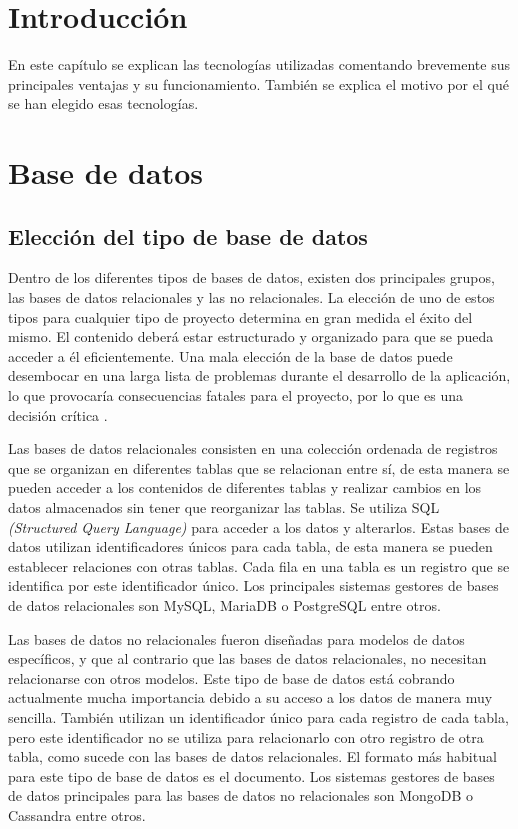 \section{Introducción}
En este capítulo se explican las tecnologías utilizadas comentando brevemente sus principales ventajas y su funcionamiento. También se explica el motivo por el qué se han elegido esas tecnologías.

\section{Base de datos}
\subsection{Elección del tipo de base de datos}
Dentro de los diferentes tipos de bases de datos, existen dos principales grupos, las bases de datos relacionales y las no relacionales. La elección de uno de estos tipos para cualquier tipo de proyecto determina en gran medida el éxito del mismo. El contenido deberá estar estructurado y organizado para que se pueda acceder a él eficientemente. Una mala elección de la base de datos puede desembocar en una larga lista de problemas durante el desarrollo de la aplicación, lo que provocaría consecuencias fatales para el proyecto, por lo que es una decisión crítica \cite{bases-diferencias}.

Las bases de datos relacionales \cite{relacional} consisten en una colección ordenada de registros que se organizan en diferentes tablas que se relacionan entre sí, de esta manera se pueden acceder a los contenidos de diferentes tablas y realizar cambios en los datos almacenados sin tener que reorganizar las tablas. Se utiliza SQL \textit{(Structured Query Language)} para acceder a los datos y alterarlos. Estas bases de datos utilizan identificadores únicos para cada tabla, de esta manera se pueden establecer relaciones con otras tablas. Cada fila en una tabla es un registro que se identifica por este identificador único. Los principales sistemas gestores de bases de datos relacionales son MySQL, MariaDB o PostgreSQL entre otros.

Las bases de datos no relacionales \cite{no-relacional} fueron diseñadas para modelos de datos específicos, y que al contrario que las bases de datos relacionales, no necesitan relacionarse con otros modelos. Este tipo de base de datos está cobrando actualmente mucha importancia debido a su acceso a los datos de manera muy sencilla. También utilizan un identificador único para cada registro de cada tabla, pero este identificador no se utiliza para relacionarlo con otro registro de otra tabla, como sucede con las bases de datos relacionales. El formato más habitual para este tipo de base de datos es el documento. Los sistemas gestores de bases de datos principales para las bases de datos no relacionales son MongoDB o Cassandra entre otros.


